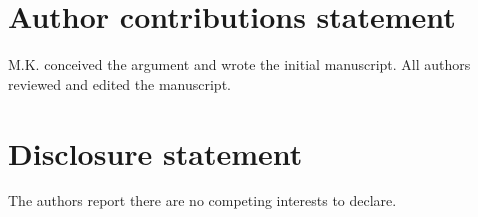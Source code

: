 \begin{titlepage}
    \section*{Author contributions statement}
    M.K. conceived the argument and wrote the initial manuscript. 
    All authors reviewed and edited the manuscript.
    
    \section*{Disclosure statement}
    The authors report there are no competing interests to declare.
    
    
    
\end{titlepage}